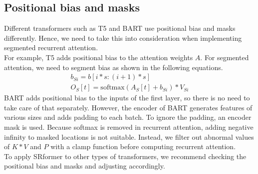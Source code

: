 \documentclass[11pt]{article}
\begin{document}
\subsection{Positional bias and masks}
\label{positionbias}
Different transformers such as T5 and BART use positional bias and masks differently. Hence, we need to take this into consideration when implementing segmented recurrent attention.\\
For example, T5 adds positional bias to the attention weights $A$. For segmented attention, we need to segment bias as shown in the following equations.
\begin{align*}
    b_{Si} = b[i*s : (i+1)*s]\\
   O_{S} [t] =  \text{softmax}( A_S[t] + b_{Si}) * V_{Si}
\end{align*}
BART adds positional bias to the inputs of the first layer, so there is no need to take care of that separately. However, the encoder of BART generates features of various sizes and adds padding to each batch. To ignore the padding, an encoder mask is used. Because softmax is removed in recurrent attention, adding negative infinity to masked locations is not suitable. Instead, we filter out abnormal values of $K*V$ and $P$ with a clamp function before computing recurrent attention.\\
To apply SRformer to other types of transformers, we recommend checking the positional bias and masks and adjusting accordingly.
\end{document}
